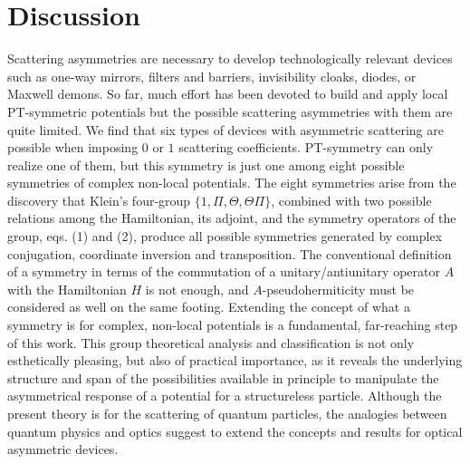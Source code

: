 \section{Discussion\label{sec:chapter1_Discussion}}
%
%
Scattering asymmetries are necessary to develop technologically relevant devices such
as one-way mirrors, filters and  barriers, invisibility cloaks, diodes, or Maxwell demons.
So far, much effort has been devoted to build and apply local PT-symmetric potentials but the possible scattering asymmetries with them are
quite limited. We find that six types of devices with asymmetric scattering are possible
when imposing $0$ or $1$ scattering coefficients.
PT-symmetry can only realize one of them, but this symmetry  is just one among eight possible symmetries of complex non-local potentials.
The eight symmetries arise from the discovery that Klein's four-group
$\{1, \Pi, \Theta, \Theta\Pi\}$, combined with two possible relations among the Hamiltonian, its adjoint,
and the symmetry operators of the group, eqs. (1) and (2),
produce all possible symmetries generated by complex conjugation, coordinate inversion and transposition.
The conventional definition of a symmetry in terms of the commutation of a unitary/antiunitary operator $A$ with the Hamiltonian $H$ is not enough, and $A$-pseudohermiticity must be considered as well on the same footing.
Extending the concept of what a symmetry is for complex, non-local potentials is
a fundamental, far-reaching step of this work.
This group theoretical analysis and classification is not only esthetically pleasing, but also of practical importance, as it reveals
the underlying structure and span of the possibilities available in principle to manipulate the asymmetrical response of a potential
for a structureless particle. Although the present theory is for the scattering of quantum particles, the analogies between quantum physics and optics suggest to extend the concepts and results for optical asymmetric devices.
%
